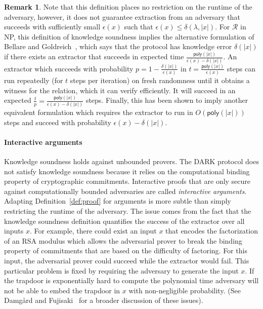 \documentclass{article}
\theoremstyle{definition}
\newtheorem{remark}{Remark}
\begin{document}
\begin{remark} Note that this definition places no restriction on the runtime of the adversary, however, it does not guarantee extraction from an adversary that succeeds with sufficiently small $\epsilon(x)$ such that $\epsilon(x) \leq  \delta(\lambda, |x|)$. For $\mathcal{R}$ in NP, this definition of knowledge soundness implies the alternative formulation of Bellare and Goldreich~\cite{C:BelGol92}, which says that the protocol has knowledge error $\delta(|x|)$ if there exists an extractor that succeeds in expected time $\frac{\textsf{poly}(|x|)}{\epsilon(x) - \delta(|x|)}$. An extractor which succeeds with probability $p = 1 - \frac{\delta(|x|)}{\epsilon(x)}$ in $t = \frac{\mathsf{poly}(|x|)}{\epsilon(x)}$ steps can run repeatedly (for $t$ steps per iteration) on fresh randomness until it obtains a witness for the relation, which it can verify efficiently. It will succeed in an expected $\frac{t}{p} =  \frac{\textsf{poly}(|x|)}{\epsilon(x) - \delta(|x|)}$ steps. Finally, this has been shown to imply another equivalent formulation which requires the extractor to run in $O(\textsf{poly}(|x|))$ steps and succeed with probability $\epsilon(x) - \delta(|x|)$.  
\end{remark}
 \fi 

\paragraph{Interactive arguments} Knowledge soundness holds against unbounded provers. The DARK protocol does not satisfy knowledge soundness because it relies on the computational binding property of cryptographic commitments. Interactive proofs that are only secure against computationally bounded adversaries are called \emph{interactive arguments}. Adapting Definition~\ref{def:proof} for arguments is more subtle than simply restricting the runtime of the adversary. The issue comes from the fact that the knowledge soundness definition quantifies the success of the extractor over all inputs $x$. For example, there could exist an input $x$ that encodes the factorization of an RSA modulus which allows the adversarial prover to break the binding property of commitments that are based on the difficulty of factoring. For this input, the adversarial prover could succeed while the extractor would fail. This particular problem is fixed by requiring the adversary to generate the input $x$. If the trapdoor is exponentially hard to compute the polynomial time adversary will not be able to embed the trapdoor in $x$ with non-negligible probability.  (See Damg\r{a}rd and Fujisaki~\cite{AC:DamFuj02} for a broader discussion of these issues).
\end{document}
